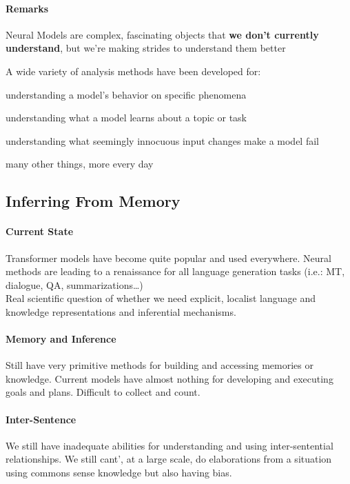 \documentclass[10pt]{report}
\begin{document}
\paragraph{Remarks}
\begin{list}{}{}
	\item Neural Models are complex, fascinating objects that \textbf{we don't currently understand}, but we're making strides to understand them better
	\item A wide variety of analysis methods have been developed for:
	\begin{list}{}{}
		\item understanding a model's behavior on specific phenomena
		\item understanding what a model learns about a topic or task
		\item understanding what seemingly innocuous input changes make a model fail
		\item many other things, more every day
	\end{list}
\end{list}
\subsection{Inferring From Memory}
\paragraph{Current State} Transformer models have become quite popular and used everywhere. Neural methods are leading to a renaissance for all language generation tasks (i.e.: MT, dialogue, QA, summarizations\ldots)\\
Real scientific question of whether we need explicit, localist language and knowledge representations and inferential mechanisms.
\paragraph{Memory and Inference} Still have very primitive methods for building and accessing memories or knowledge. Current models have almost nothing for developing and executing goals and plans. Difficult to collect and count.
\paragraph{Inter-Sentence} We still have inadequate abilities for understanding and using inter-sentential relationships. We still cant', at a large scale, do elaborations from a situation using commons sense knowledge but also having bias.
\end{document}
